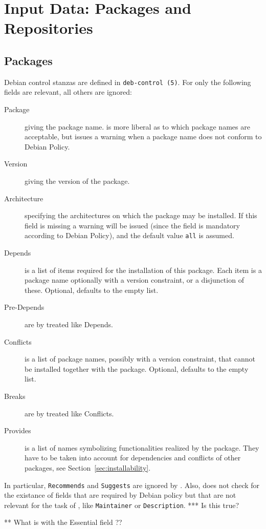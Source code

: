 \section{Input Data: Packages and Repositories}
\label{sec:data}
\subsection{Packages}
Debian control stanzas are defined in \texttt{deb-control (5)}. For
\debcheck{} only the following fields are relevant, all others are
ignored:
\begin{description}
\item[Package] giving the package name. \debcheck{} is more liberal as
  to which package names are acceptable, but issues a warning when a
  package name does not conform to Debian Policy.
\item[Version] giving the version of the package.
\item[Architecture] specifying the architectures on which the package
  may be installed. If this field is missing a warning will be issued
  (since the field is mandatory according to Debian Policy), and the
  default value \texttt{all} is assumed.
\item[Depends] is a list of items required for the installation of
  this package. Each item is a package name optionally with a version
  constraint, or a disjunction of these. Optional, defaults to the
  empty list.
\item[Pre-Depends] are by \debcheck{} treated like Depends.
\item[Conflicts] is a list of package names, possibly with a version
  constraint, that cannot be installed together with the package. Optional,
  defaults to the empty list.
\item[Breaks] are by \debcheck{} treated like Conflicts.
\item[Provides] is a list of names symbolizing functionalities realized by the
  package. They have to be taken into account for dependencies and conflicts
  of other packages, see Section~\ref{sec:installability}.
\end{description}

In particular, \texttt{Recommends} and \texttt{Suggests} are ignored
by \debcheck. Also, \debcheck{} does not check for the existance of
fields that are required by Debian policy but that are not relevant
for the task of \debcheck, like \texttt{Maintainer} or
\texttt{Description}. *** Is this true?

** What is with the Essential field ??

